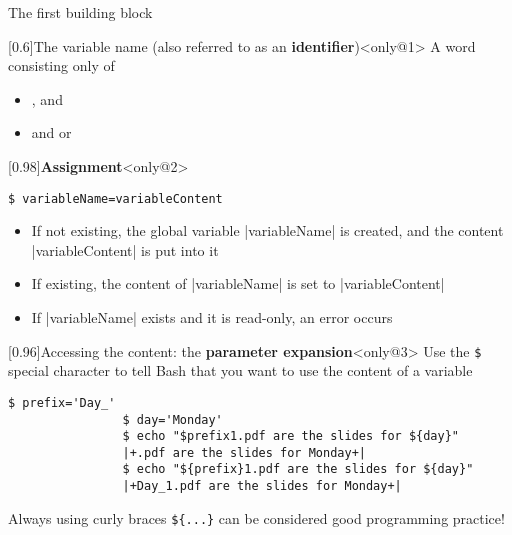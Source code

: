 \begin{frame}[fragile]{The first building block}
\begin{overlayarea}{\textwidth}{0.3\textheight}
        \vspace{-6mm}
        \begin{varblock*}{}[0.6\textwidth]{The variable name (also referred to as an \textbf{identifier})}<only@1>
            A word consisting only of
            \begin{itemize}
                \item {},  and 
                \item and  or 
            \end{itemize}
        \end{varblock*}
        \begin{varblock*}{}[0.98\textwidth]{\textbf{Assignment}}<only@2>
            \begin{lstlisting}[style=MyBash, numbers=none, xrightmargin=26mm, xleftmargin=26mm]
                $ variableName=variableContent
            \end{lstlisting}
            \begin{itemize}
                \item If not existing, the \alert{global} variable \bash|variableName| is created, and the content \bash|variableContent| is put into it
                \item If existing, the content of \bash|variableName| is set to \bash|variableContent|
                \item If \bash|variableName| exists and it is read-only, an error occurs
            \end{itemize}
        \end{varblock*}
        \begin{varblock}{}[0.96\textwidth]{Accessing the content: the \textbf{parameter expansion}}<only@3>
            Use the \texttt{\$} special character to tell Bash that you want to use the content of a variable
            \begin{lstlisting}[style=MyBash, numbers=none, belowskip=-5mm]
                $ prefix='Day_'
                $ day='Monday'
                $ echo "$prefix1.pdf are the slides for ${day}"
                |+.pdf are the slides for Monday+|
                $ echo "${prefix}1.pdf are the slides for ${day}"
                |+Day_1.pdf are the slides for Monday+|
            \end{lstlisting}
            \alert{Always} using curly braces \alert{\texttt{\$\{...\}}} can be considered \alert{good programming practice}!
        \end{varblock}

\end{overlayarea}
\end{frame}
